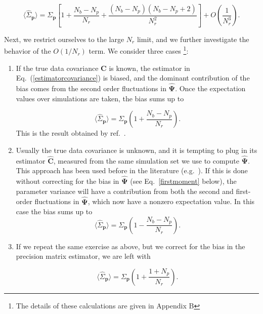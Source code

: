 \documentclass[reprint,aps,prd,superscriptaddress,showkeys,showpacs]{revtex4-1}
\newcommand{\bb}[1]{\mathbf{#1}}
\newcommand{\bbh}[1]{\mathbf{\hat{#1}}}
\newcommand{\h}[1]{\hat{#1}}
\begin{document}
\begin{widetext}
\begin{equation}
\label{quarticdegradation}
\langle\h{\Sigma}_\bb{p}\rangle = \Sigma_\bb{p}\left[1+\frac{N_b-N_p}{N_r}+\frac{(N_b-N_p)(N_b-N_p+2)}{N_r^2}\right] + O\left(\frac{1}{N_r^3}\right).
\end{equation}
\end{widetext}
%
Next, we restrict ourselves to the large $N_r$ limit, and we further
investigate the behavior of the $O(1/N_r)$ term. We consider three
cases \footnote{The details of these calculations are given in
  Appendix B}:


\begin{enumerate}
\item If the true data covariance $\bb{C}$ is known, the estimator in
  Eq.~(\ref{estimatorcovariance}) is biased, and the dominant
  contribution of the bias comes from the second order fluctuations in
  $\bbh{\Psi}$. Once the expectation values over simulations are
  taken, the bias sums up to

\begin{equation}
\label{dodelsonscaling}
\langle\h{\Sigma}_\bb{p}\rangle=\Sigma_\bb{p}\left(1+\frac{N_b-N_p}{N_r}\right).
\end{equation}
%
This is the result obtained by ref.~\citep{DodelsonSchneider13}.

\item Usually the true data covariance is unknown, and it is tempting
  to plug in its estimator $\bbh{C}$, measured from the same
  simulation set we use to compute $\bbh{\Psi}$. This approach has
  been used before in the literature
  (e.g.~\citep{MinkPetri,MinkShirasaki}). If this is done without
  correcting for the bias in $\bbh{\Psi}$ (see Eq.~\ref{firstmoment}
  below), 
  the parameter variance will have a contribution from both the second
  and first-order fluctuations in $\bbh{\Psi}$, which now have a
  nonzero expectation value. In this case the bias sums up to
%
\begin{equation}
\label{mockscalinguncorrected}
\langle\h{\Sigma}_\bb{p}\rangle=\Sigma_\bb{p}\left(1-\frac{N_b-N_p}{N_r}\right).
\end{equation}

\item If we repeat the same exercise as above, but we correct for the
  bias in the precision matrix estimator, we are left with

\begin{equation}
\label{mockscalingcorrected}
\langle\h{\Sigma}_\bb{p}\rangle=\Sigma_\bb{p}\left(1+\frac{1+N_p}{N_r}\right).
\end{equation}

\end{enumerate} 
\end{document}
